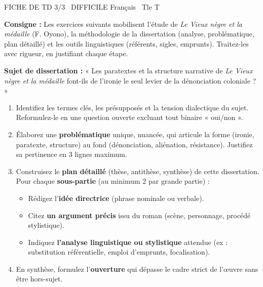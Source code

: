 \documentclass[11pt]{article}
\begin{document}
\begin{tcolorbox}[enhanced,colback=popink,colframe=popink,arc=10pt,boxrule=0pt,left=12pt,right=12pt,top=9pt,bottom=9pt]
{\color{white}\popxbold\small FICHE DE TD 3/3 \textbullet\ DIFFICILE \hfill Français \textbullet\ Tle T\par}
\end{tcolorbox}
\vspace{4pt}
\noindent \textbf{Consigne :} Les exercices suivants mobilisent l'étude de \textit{Le Vieux nègre et la médaille} (F. Oyono), la méthodologie de la dissertation (analyse, problématique, plan détaillé) et les outils linguistiques (référents, sigles, emprunts). Traitez-les avec rigueur, en justifiant chaque étape.

\begin{exercice}
\textbf{Sujet de dissertation :} « Les paratextes et la structure narrative de \textit{Le Vieux nègre et la médaille} font-ils de l'ironie le seul levier de la dénonciation coloniale ? »

\begin{enumerate}
    \item Identifiez les termes clés, les présupposés et la tension dialectique du sujet. Reformulez-le en une question ouverte excluant tout binaire « oui/non ».
    \item Élaborez une \textbf{problématique} unique, nuancée, qui articule la forme (ironie, paratexte, structure) au fond (dénonciation, aliénation, résistance). Justifiez sa pertinence en 3 lignes maximum.
    \item Construisez le \textbf{plan détaillé} (thèse, antithèse, synthèse) de cette dissertation. Pour chaque \textbf{sous-partie} (au minimum 2 par grande partie) :
    \begin{itemize}
        \item Rédigez l'\textbf{idée directrice} (phrase nominale ou verbale).
        \item Citez \textbf{un argument précis} issu du roman (scène, personnage, procédé stylistique).
        \item Indiquez \textbf{l'analyse linguistique ou stylistique} attendue (ex : substitution référentielle, emploi d'emprunts, focalisation).
    \end{itemize}
    \item En synthèse, formulez l'\textbf{ouverture} qui dépasse le cadre strict de l'œuvre sans être hors-sujet.
\end{enumerate}
\end{exercice}
\end{document}
